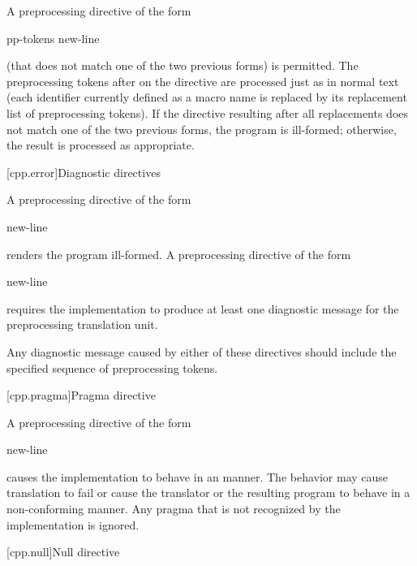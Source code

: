 \pnum
A preprocessing directive of the form
\begin{ncsimplebnf}
 pp-tokens new-line
\end{ncsimplebnf}
(that does not match one of the two previous forms)
is permitted.
The preprocessing tokens after
on the directive are processed just as in normal text
(each identifier currently defined as a macro name is replaced by its
replacement list of preprocessing tokens).
If the directive resulting after all replacements does not match
one of the two previous forms, the program is ill-formed;
otherwise, the result is processed as appropriate.

[cpp.error]{Diagnostic directives}%
%
%
%

\pnum
A preprocessing directive of the form
\begin{ncsimplebnf}
  new-line
\end{ncsimplebnf}
renders the program ill-formed.
A preprocessing directive of the form
\begin{ncsimplebnf}
  new-line
\end{ncsimplebnf}
requires the implementation to produce at least one diagnostic message
for the preprocessing translation unit.

\pnum
\recommended
Any diagnostic message caused by either of these directives
should include the specified sequence of preprocessing tokens.

[cpp.pragma]{Pragma directive}%
%

\pnum
A preprocessing directive of the form
\begin{ncsimplebnf}
  new-line
\end{ncsimplebnf}
causes the implementation to behave
in an  manner.
The behavior may cause translation to fail or cause the translator or
the resulting program to behave in a non-conforming manner.
Any pragma that is not recognized by the implementation is ignored.

[cpp.null]{Null directive}%

